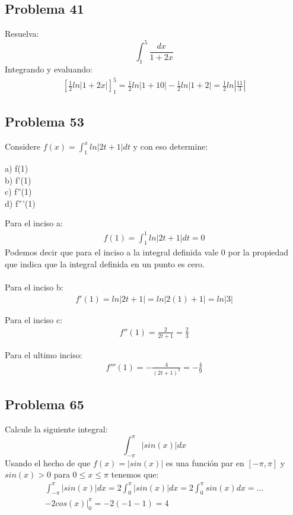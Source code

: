 \documentclass{article}
\begin{document}
\subsection{Problema 41}
Resuelva:
$$
  \int_{1}^{5}\frac{dx}{1+2x}
$$
Integrando y evaluando:
\begin{align*}
  \left[\frac{1}{2}ln\left|1+2x\right|\right]_{1}^{5} = \frac{1}{2}ln\left|1+10\right| - \frac{1}{2}ln\left|1+2\right| = \frac{1}{2}ln\left|\frac{11}{3}\right|
\end{align*}
\subsection{Problema 53}
Considere $ f(x) = \int_{1}^{x}ln\left|2t+1\right|dt $ y con eso determine:
\begin{center}
  a) f(1) \\
  b) f'(1) \\
  c) f''(1) \\
  d) f'''(1)
\end{center}
Para el inciso a:
\begin{align*}
  f(1) = \int_{1}^{1} ln\left|2t+1\right|dt = 0
\end{align*}
Podemos decir que para el inciso a la integral definida vale 0 por la propiedad que indica que la integral definida en un punto es cero. \\ \\
Para el inciso b:
\begin{align*}
  f'(1) = ln\left|2t+1\right| = ln\left|2(1)+1\right| = ln\left|3\right|
\end{align*}

Para el inciso c:
\begin{align*}
  f''(1) = \frac{2}{2t+1} = \frac{2}{3}
\end{align*}

Para el ultimo inciso:
\begin{align*}
  f'''(1) = -\frac{4}{(2t+1)^2} = -\frac{4}{9}
\end{align*}

\subsection{Problema 65}
Calcule la siguiente integral:
$$
  \int_{-\pi}^{\pi}|sin(x)|dx
$$
Usando el hecho de que $ f (x)= | sin (x)| $ es una función par en $ [-\pi,\pi] $ y $ sin (x) > 0 $ para $ 0 \leq x \leq  \pi $ tenemos que:
\begin{align*}
  \int_{-\pi}^{\pi}|sin(x)|dx = 2\int_{0}^{\pi}|sin(x)|dx = 2 \int_{0}^{\pi}sin(x)dx = \dots \\ \left.-2cos(x)\right|^{\pi}_{0} = -2(-1-1) = 4
\end{align*}
\end{document}
